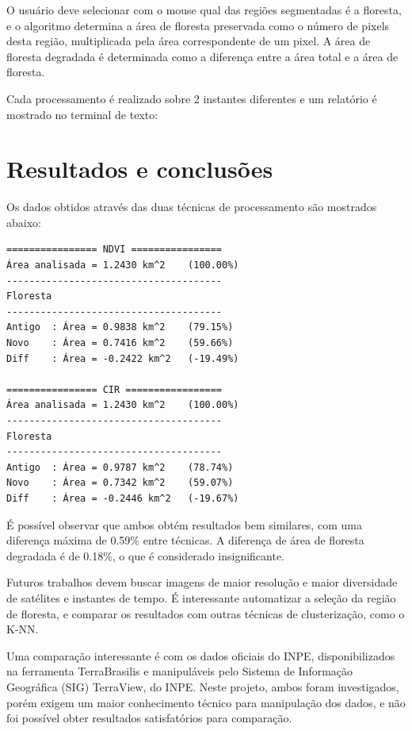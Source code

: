 \documentclass[11pt]{article}
\begin{document}
O usuário deve selecionar com o mouse qual das regiões segmentadas é a floresta, e o algoritmo determina a área de floresta preservada como o número de pixels desta região, multiplicada pela área correspondente de um pixel. A área de floresta degradada é determinada como a diferença entre a área total e a área de floresta.

Cada processamento é realizado sobre 2 instantes diferentes e um relatório é mostrado no terminal de texto:

\section{Resultados e conclusões}

Os dados obtidos através das duas técnicas de processamento são mostrados abaixo:

\begin{verbatim}
================ NDVI ================
Área analisada = 1.2430 km^2 	(100.00%)
--------------------------------------
Floresta
--------------------------------------
Antigo  : Área = 0.9838 km^2 	(79.15%)
Novo    : Área = 0.7416 km^2 	(59.66%)
Diff    : Área = -0.2422 km^2 	(-19.49%)

================ CIR =================
Área analisada = 1.2430 km^2 	(100.00%)
--------------------------------------
Floresta
--------------------------------------
Antigo  : Área = 0.9787 km^2 	(78.74%)
Novo    : Área = 0.7342 km^2 	(59.07%)
Diff    : Área = -0.2446 km^2 	(-19.67%)
\end{verbatim}

É possível observar que ambos obtém resultados bem similares, com uma diferença máxima de 0.59\% entre técnicas. A diferença de área de floresta degradada é de 0.18\%, o que é considerado insignificante.

Futuros trabalhos devem buscar imagens de maior resolução e maior diversidade de satélites e instantes de tempo. É interessante automatizar a seleção da região de floresta, e comparar os resultados com outras técnicas de clusterização, como o K-NN.

Uma comparação interessante é com os dados oficiais do INPE, disponibilizados na ferramenta TerraBrasilis e manipuláveis pelo Sistema de Informação Geográfica (SIG) TerraView, do INPE. Neste projeto, ambos foram investigados, porém exigem um maior conhecimento técnico para manipulação dos dados, e não foi possível obter resultados satisfatórios para comparação.




\end{document}
